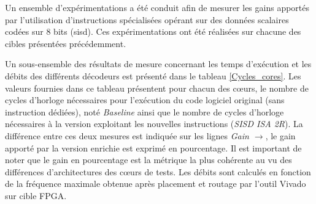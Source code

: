 \documentclass[../main.tex]{subfiles}
\begin{document}
Un ensemble d'expérimentations a été conduit afin de mesurer les gains apportés par l'utilisation d'instructions spécialisées opérant sur des données scalaires codées sur 8 bits (\acrshort{sisd}). Ces expérimentations ont été réalisées sur chacune des cibles présentées précédemment. 

Un sous-ensemble des résultats de mesure concernant les temps d'exécution et les débits des différents décodeurs est présenté dans le tableau \ref{Cycles_cores}.
Les valeurs fournies dans ce tableau présentent pour chacun des cœurs, le nombre de cycles d'horloge nécessaires pour l'exécution du code logiciel original (sans instruction dédiées), noté \textit{Baseline} ainsi que le nombre de cycles d'horloge nécessaires à la version exploitant les nouvelles instructions (\textit{SISD ISA 2R}). 
La différence entre ces deux mesures est indiquée sur les lignes \textit{Gain $\rightarrow$}, le gain apporté par la version enrichie est exprimé en pourcentage.
Il est important de noter que le gain en pourcentage est la métrique la plus cohérente au vu des différences d'architectures des cœurs de tests. Les débits sont calculés en fonction de la fréquence maximale obtenue après placement et routage par l'outil Vivado sur cible FPGA.
\end{document}
